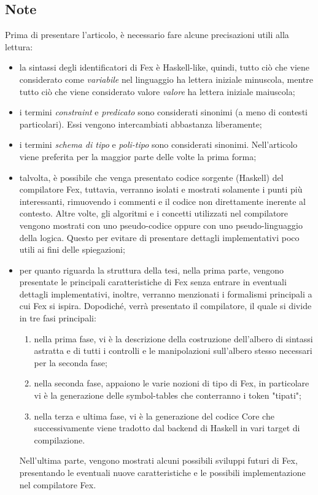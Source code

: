 \documentclass[10pt,a4paper]{article}
\begin{document}
\subsection{Note}
Prima di presentare l'articolo, è necessario fare alcune precisazioni utili alla lettura:
\begin{itemize}
    \item la sintassi degli identificatori di Fex è Haskell-like, quindi, tutto ciò che viene considerato come
    \textit{variabile} nel linguaggio ha lettera iniziale minuscola, mentre tutto ciò che viene considerato valore
    \textit{valore} ha lettera iniziale maiuscola;
    \item i termini \textit{constraint} e \textit{predicato} sono considerati sinonimi (a meno di contesti particolari).
    Essi vengono intercambiati abbastanza liberamente;
    \item i termini \textit{schema di tipo} e \textit{poli-tipo} sono considerati sinonimi. Nell'articolo viene preferita
    per la maggior parte delle volte la prima forma;
    \item talvolta, è possibile che venga presentato codice sorgente (Haskell) del compilatore Fex, tuttavia, verranno
    isolati e mostrati solamente i punti più interessanti, rimuovendo i commenti e il codice non direttamente inerente
    al contesto. Altre volte, gli algoritmi e i concetti utilizzati nel compilatore vengono mostrati con uno
    pseudo-codice oppure con uno pseudo-linguaggio della logica. Questo per evitare di presentare dettagli implementativi
    poco utili ai fini delle spiegazioni;
    \item per quanto riguarda la struttura della tesi, nella prima parte, vengono presentate le principali caratteristiche di
    Fex senza entrare in eventuali dettagli implementativi, inoltre, verranno menzionati i formalismi principali a cui Fex
    si ispira. Dopodiché, verrà presentato il compilatore, il quale si divide in tre fasi principali:
    \begin{enumerate}
        \item nella prima fase, vi è la descrizione della costruzione dell'albero di sintassi astratta e di tutti
        i controlli e le manipolazioni sull'albero stesso necessari per la seconda fase;
        \item nella seconda fase, appaiono le varie nozioni di tipo di Fex, in particolare vi è la generazione delle
        symbol-tables che conterranno i token "tipati";
        \item nella terza e ultima fase, vi è la generazione del codice Core che successivamente viene tradotto dal backend di
        Haskell in vari target di compilazione.
    \end{enumerate}
    Nell'ultima parte, vengono mostrati alcuni possibili sviluppi futuri di Fex, presentando le eventuali nuove caratteristiche
    e le possibili implementazione nel compilatore Fex.
\end{itemize}
\end{document}
